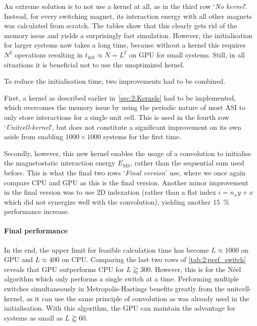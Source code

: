An extreme solution is to not use a kernel at all, as in the third row `\textit{No kernel}'.
Instead, for every switching magnet, its interaction energy with all other magnets was calculated from scratch.
The tables show that this clearly gets rid of the memory issue and yields a surprisingly fast simulation.
However, the initialisation for larger systems now takes a long time, because without a kernel this requires $N^2$ operations resulting in $t_\mathrm{init} \propto N=L^2$ on GPU for small systems.
Still, in all situations it is beneficial not to use the unoptimized kernel. \\\par

To reduce the initialisation time, two improvements had to be combined. \par
First, a kernel as described earlier in~\cref{sec:2:Kernels} had to be implemented, which overcomes the memory issue by using the periodic nature of most ASI to only store interactions for a single unit cell.
This is used in the fourth row `\textit{Unitcell-kernel}', but does not constitute a significant improvement on its own aside from enabling $1000 \times 1000$ systems for the first time. \par
Secondly, however, this new kernel enables the usage of a convolution to initialise the magnetostatic interaction energy $E_\mathrm{MS}$, rather than the sequential sum used before.
This is what the final two rows `\textit{Final version}' use, where we once again compare CPU and GPU as this is the final version.
Another minor improvement in the final version was to use 2D indexation (rather than a flat index $i = n_x y + x$ which did not synergize well with the convolution), yielding another \SI{15}{\percent} performance increase.

\paragraph{Final performance}
In the end, the upper limit for feasible calculation time has become $L \approx 1000$ on GPU and $L \approx 400$ on CPU.
Comparing the last two rows of \cref{tab:2:perf_switch} reveals that GPU outperforms CPU for $L \gtrapprox 300$.
However, this is for the N\'eel algorithm which only performs a single switch at a time.
Performing multiple switches simultaneously in Metropolis-Hastings benefits greatly from the unitcell-kernel, as it can use the same principle of convolution as was already used in the initialisation.
With this algorithm, the GPU can maintain the advantage for systems as small as $L \gtrapprox 60$.

